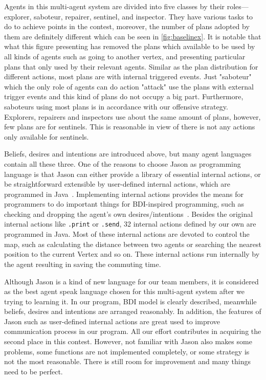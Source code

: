 Agents in this multi-agent system are divided into five classes by their roles---explorer, saboteur, repairer, sentinel, and inspector.
They have various tasks to do to achieve points in the contest, moreover, the number of plans adopted by them are definitely different which can be seen in \autoref{fig:baselinex}.
It is notable that what this figure presenting has removed the plans which available to be used by all kinds of agents such as going to another vertex, and presenting particular plans that only used by their relevant agents.
Similar as the plan distribution for different actions, most plans are with internal triggered events.
Just "saboteur" which the only role of agents can do action "attack" use the plans with external trigger events and this kind of plans do not occupy a big part.
Furthermore, saboteurs using most plans is in accordance with our offensive strategy.
Explorers, repairers and inspectors use about the same amount of plans, however, few plans are for sentinels.
This is reasonable in view of there is not any actions only available for sentinels.

Beliefs, desires and intentions are introduced above, but many agent languages contain all these three.
One of the reasons to choose Jason as programming language is that Jason can either provide a library of essential internal actions, or be straightforward extensible by user-defined internal actions, which are programmed in Java~\cite{rafael_Javabased_2007}.
Implementing internal actions provides the means for programmers to do important things for BDI-inspired programming, such as checking and dropping the agent's own
desires/intentions~\cite{rafael_overviewjason_2006}.
Besides the original internal actions like \texttt{.print} or \texttt{.send}, 32 internal actions defined by our own are programmed in Java.
Most of these internal actions are devoted to control the map, such as calculating the distance between two agents or searching the nearest position to the current Vertex and so on.
These internal actions run internally by the agent resulting in saving the commuting time.

Although Jason is a kind of new language for our team members, it is considered as the best agent speak language chosen for this multi-agent system after we trying to learning it.
In our program, BDI model is clearly described, meanwhile beliefs, desires and intentions are arranged reasonably.
In addition, the features of Jason such as user-defined internal actions are great used to improve communication process in our program.
All our effort contributes in acquiring the second place in this contest.
However, not familiar with Jason also makes some problems, some functions are not implemented completely, or some strategy is not the most reasonable.
There is still room for improvement and many things need to be perfect.
